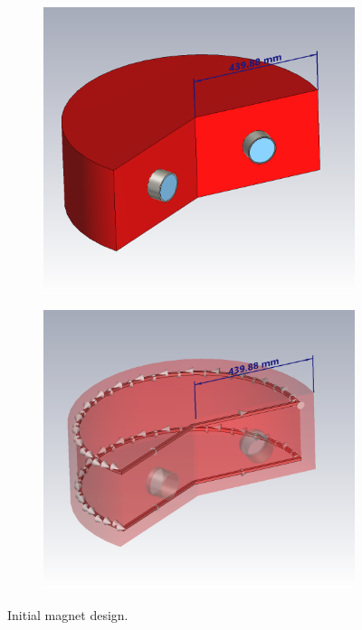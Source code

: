 \documentclass[a4paper,oneside,12pt]{report}
\numberwithin{equation}{chapter}
\begin{document}
\begin{figure}[H]
    \captionsetup[subfigure]{justification=centering}
    \captionsetup{justification=centering}
    \centering
    \begin{subfigure}{.5\textwidth}
      \centering
      \includegraphics[width=.9\linewidth]{./figures/cst/cst_first_magnet_design1.png}
    \end{subfigure}%
    \centering
    \begin{subfigure}{.5\textwidth}
      \centering
      \includegraphics[width=.92\linewidth]{./figures/cst/cst_first_magnet_design2.png}
    \end{subfigure}
    \caption{Initial magnet design.}
    \label{fig:initial_magnet_design}
\end{figure}
\end{document}
